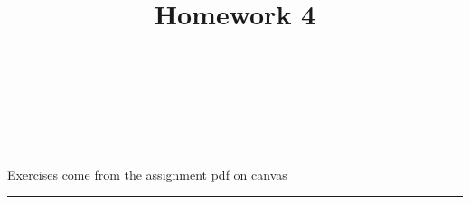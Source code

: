 \documentclass[10pt]{amsart}
\theoremstyle{nonumberplain}
\begin{document}
\pagestyle{empty}

\newcommand{\mline}{\vspace{.2in}\hrule\vspace{.2in}}

\noindent
{} \\
 \\
 \\
 \\

\title{\bf {Homework 4} }


\maketitle
\noindent
Exercises come from the assignment pdf on canvas
\mline
\end{document}
